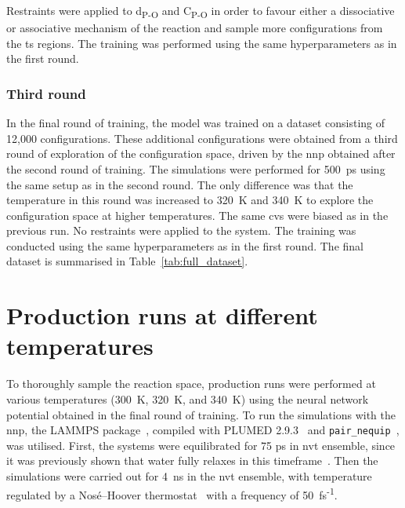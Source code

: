 Restraints were applied to d\textsubscript{P-O} and C\textsubscript{P-O} in order to favour either a dissociative or associative mechanism of the reaction and sample more configurations from the \ac{ts} regions. The training was performed using the same hyperparameters as in the first round.



\subsubsection{Third round}
In the final round of training, the model was trained on a dataset consisting of 12,000 configurations. These additional configurations were obtained from a third round of exploration of the configuration space, driven by the \ac{nnp} obtained after the second round of training. The simulations were performed for 500~ps using the same setup as in the second round. The only difference was that the temperature in this round was increased to 320~K and 340~K to explore the configuration space at higher temperatures. The same \acp{cv} were biased as in the previous run. No restraints were applied to the system. The training was conducted using the same hyperparameters as in the first round. The final dataset is summarised in Table~\ref{tab:full_dataset}.




\section{Production runs at different temperatures}
To thoroughly sample the reaction space, production runs were performed at various temperatures (300~K, 320~K, and 340~K) using the neural network potential obtained in the final round of training. To run the simulations with the \ac{nnp}, the LAMMPS package~\citep{thompsonLAMMPSFlexibleSimulation2022}, compiled with PLUMED 2.9.3~\citep{tribelloPLUMED2New2014} and \texttt{pair\_nequip}~\citep{MirgroupPair_nequip}, was utilised. First, the systems were equilibrated for 75 ps in \ac{nvt} ensemble, since it was previously shown that water fully relaxes in this timeframe~\citep{moronMacroNanoScale2016}. Then the simulations were carried out for 4~ns in the \ac{nvt} ensemble, with temperature regulated by a Nos\'e--Hoover thermostat~\citep{noseUnifiedFormulationConstant1984, hooverCanonicalDynamicsEquilibrium1985} with a frequency of 50~fs\textsuperscript{-1}.

